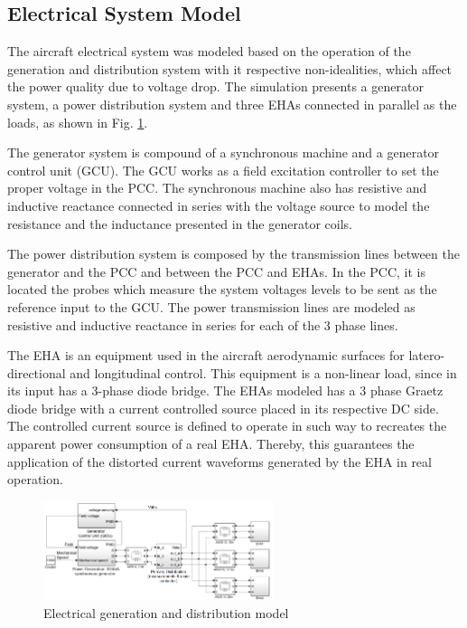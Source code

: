 \subsection{Electrical System Model}

The aircraft electrical system was modeled based on the operation of the generation and distribution system with it respective non-idealities, which affect the power quality due to voltage drop. The simulation presents a generator system, a power distribution system and three EHAs connected in parallel as the loads, as shown in Fig. \ref{fig:simulacao_simulink.png}.

The generator system is compound of a synchronous machine and a generator control unit (GCU). The GCU works as a field excitation controller to set the proper voltage in the PCC. The synchronous machine also has resistive and inductive reactance connected in series with the voltage source to model the resistance and the inductance presented in the generator coils.

The power distribution system is composed by the transmission lines between the generator and the PCC and between the PCC and EHAs. In the PCC, it is located the probes which measure the system voltages levels to be sent as the reference input to the GCU. The power transmission lines are modeled as resistive and inductive reactance in series for each of the 3 phase lines.

The EHA is an equipment used in the aircraft aerodynamic surfaces for latero-directional and longitudinal control. This equipment is a non-linear load, since in its input has a 3-phase diode bridge. The EHAs modeled has a 3 phase Graetz diode bridge with a current controlled source placed in its respective DC side. The controlled current source is defined to operate in such way to recreates the apparent power consumption of a real EHA. Thereby, this guarantees the application of the distorted current waveforms generated by the EHA in real operation.

\begin{figure}[!tb] %
	\centering
	\includegraphics[width=0.6\textwidth]{Figures/simulacao_simulink.png}
	\caption{Electrical generation and distribution model}
	\label{fig:simulacao_simulink.png}
\end{figure}

